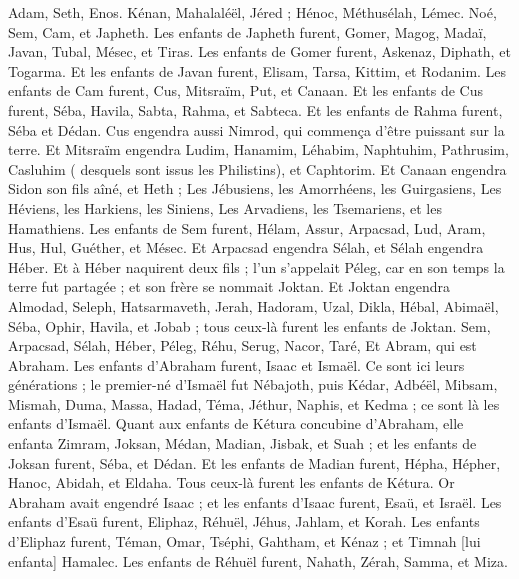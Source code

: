\BFont
\begin{multicols}{2}
\VerseOne{}Adam, Seth, Enos.
Kénan, Mahalaléël, Jéred ;
Hénoc, Méthusélah, Lémec.
Noé, Sem, Cam, et Japheth.
Les enfants de Japheth furent, Gomer, Magog, Madaï, Javan, Tubal, Mésec, et Tiras.
Les enfants de Gomer furent, Askenaz, Diphath, et Togarma.
Et les enfants de Javan furent, Elisam, Tarsa, Kittim, et Rodanim.
Les enfants de Cam furent, Cus, Mitsraïm, Put, et Canaan.
Et les enfants de Cus furent, Séba, Havila, Sabta, Rahma, et Sabteca. Et les enfants de Rahma furent, Séba et Dédan.
Cus engendra aussi Nimrod, qui commença d'être puissant sur la terre.
Et Mitsraïm engendra Ludim, Hanamim, Léhabim, Naphtuhim,
Pathrusim, Casluhim ( desquels sont issus les Philistins), et Caphtorim.
Et Canaan engendra Sidon son fils aîné, et Heth ;
Les Jébusiens, les Amorrhéens, les Guirgasiens,
Les Héviens, les Harkiens, les Siniens,
Les Arvadiens, les Tsemariens, et les Hamathiens.
Les enfants de Sem furent, Hélam, Assur, Arpacsad, Lud, Aram, Hus, Hul, Guéther, et Mésec.
Et Arpacsad engendra Sélah, et Sélah engendra Héber.
Et à Héber naquirent deux fils ; l'un s'appelait Péleg, car en son temps la terre fut partagée ; et son frère se nommait Joktan.
Et Joktan engendra Almodad, Seleph, Hatsarmaveth, Jerah,
Hadoram, Uzal, Dikla,
Hébal, Abimaël, Séba,
Ophir, Havila, et Jobab ; tous ceux-là furent les enfants de Joktan.
Sem, Arpacsad, Sélah,
Héber, Péleg, Réhu,
Serug, Nacor, Taré,
Et Abram, qui est Abraham.
Les enfants d'Abraham furent, Isaac et Ismaël.
Ce sont ici leurs générations ; le premier-né d'Ismaël fut Nébajoth, puis Kédar, Adbéël, Mibsam,
Mismah, Duma, Massa, Hadad, Téma,
Jéthur, Naphis, et Kedma ; ce sont là les enfants d'Ismaël.
Quant aux enfants de Kétura concubine d'Abraham, elle enfanta Zimram, Joksan, Médan, Madian, Jisbak, et Suah ; et les enfants de Joksan furent, Séba, et Dédan.
Et les enfants de Madian furent, Hépha, Hépher, Hanoc, Abidah, et Eldaha. Tous ceux-là furent les enfants de Kétura.
Or Abraham avait engendré Isaac ; et les enfants d'Isaac furent, Esaü, et Israël.
Les enfants d'Esaü furent, Eliphaz, Réhuël, Jéhus, Jahlam, et Korah.
Les enfants d'Eliphaz furent, Téman, Omar, Tséphi, Gahtham, et Kénaz ; et Timnah [lui enfanta] Hamalec.
Les enfants de Réhuël furent, Nahath, Zérah, Samma, et Miza.

\end{multicols}
